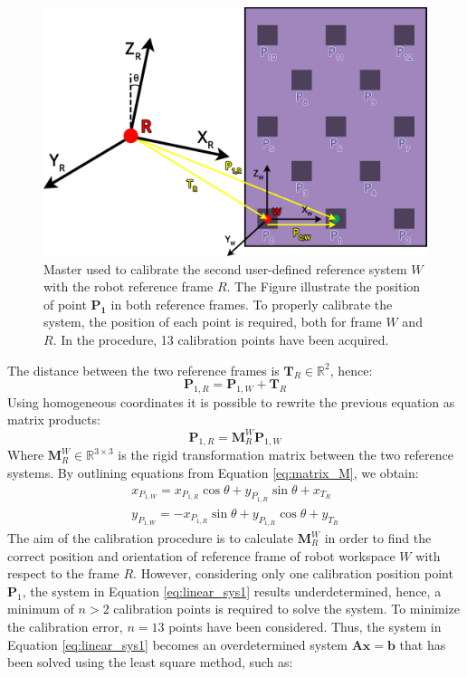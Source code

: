 \documentclass[letterpaper, 10 pt, conference]{ieeeconf}  %
\begin{document}
\begin{figure}[h]
	\centering
	\includegraphics[width=1\columnwidth]{figures/calibration.png}
	\caption{Master used to calibrate the second user-defined reference system $W$ with the robot reference frame $R$. The Figure illustrate the position of  point $\mathbf{P_1}$ in both reference frames. To properly calibrate the system, the position of each point is required, both for frame $W$ and $R$. In the procedure, 13 calibration points have been acquired.}
	\label{fig:master_robot}
\end{figure}

The distance between the two reference frames is $\mathbf{T}_R\in\mathbb{R}^2$, hence:
\begin{equation}
\mathbf{P}_{1,R} = \mathbf{P}_{1,W} + \mathbf{T}_R
\end{equation}
Using homogeneous coordinates it is possible to rewrite the previous equation as matrix products:
\begin{equation}\label{eq:matrix_M}
\mathbf{P}_{1,R} = \mathbf{M}^W_{R}\mathbf{P}_{1,W}
\end{equation}
Where $\mathbf{M}^W_{R}\in\mathbb{R}^{3\times3}$ is the rigid transformation matrix between the two reference systems. By outlining equations from Equation \ref{eq:matrix_M}, we obtain:
\begin{equation}\label{eq:linear_sys1}
\begin{gathered}
x_{P_{1,W}}=x_{P_{1,R}}\cos\theta+y_{P_{1,R}}\sin\theta+x_{T_R}\\
y_{P_{1,W}}=-x_{P_{1,R}}\sin\theta+y_{P_{1,R}}\cos\theta+y_{T_R}
\end{gathered}
\end{equation}
The aim of the calibration procedure is to calculate $\mathbf{M}^W_{R}$ in order to find the correct position and orientation of reference frame of robot workspace $W$ with respect to the frame $R$. However, considering only one calibration position point $\mathbf{P}_1$, the system in Equation \ref{eq:linear_sys1} results underdetermined, hence, a minimum of $n>2$ calibration points is required to solve the system. To minimize the calibration error, $n=13$ points have been considered. Thus, the system in Equation \ref{eq:linear_sys1} becomes an overdetermined system $\mathbf{A}\mathbf{x}=\mathbf{b}$ that has been solved using the least square method, such as:
\end{document}
